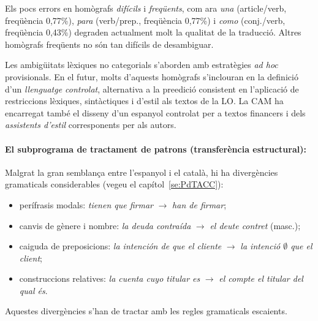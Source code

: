 Els pocs errors en homògrafs \emph{difícils} i \emph{freqüents}, com
ara \emph{una} (article/verb, freqüència 0,77\%), \emph{para}
(verb/prep., freqüència 0,77\%) i \emph{como} (conj./verb, freqüència
0,43\%) degraden actualment molt la qualitat de la traducció. Altres
homògrafs freqüents no són tan difícils de desambiguar.

Les ambigüitats lèxiques no categorials s'aborden amb estratègies {\em
  ad hoc} provisionals. En el futur, molts d'aquests homògrafs
s'inclouran en la definició d'un \emph{llenguatge controlat},
alternativa a la preedició consistent en l'aplicació de restriccions
lèxiques, sintàctiques i d'estil als textos de la LO. La CAM ha
encarregat també el disseny d'un espanyol controlat per a textos
financers i dels \emph{assistents d'estil} corresponents per als
autors.


\paragraph{El subprograma de tractament de patrons (transferència
  estructural):} 
Malgrat la gran semblança entre l'espanyol i el català, hi ha
divergències gramaticals considerables (vegeu el capítol~\ref{se:PdTACC}):
\begin{itemize}
\item perífrasis modals: \emph{tienen que firmar}
$\rightarrow$ \emph{han de firmar}; 
\item canvis de gènere i nombre: \emph{la deuda
  contraída} $\rightarrow$ \emph{el deute contret} (masc.);
\item caiguda de preposicions: \emph{la intención de que el cliente} $\rightarrow$ \emph{la
intenció $\emptyset$ que el client}; 
\item construccions relatives: \emph{la cuenta cuyo titular es} $\rightarrow$ \emph{el compte el
    titular del qual és}.
\end{itemize}
Aquestes divergències s'han de tractar amb les regles gramaticals
escaients.  


